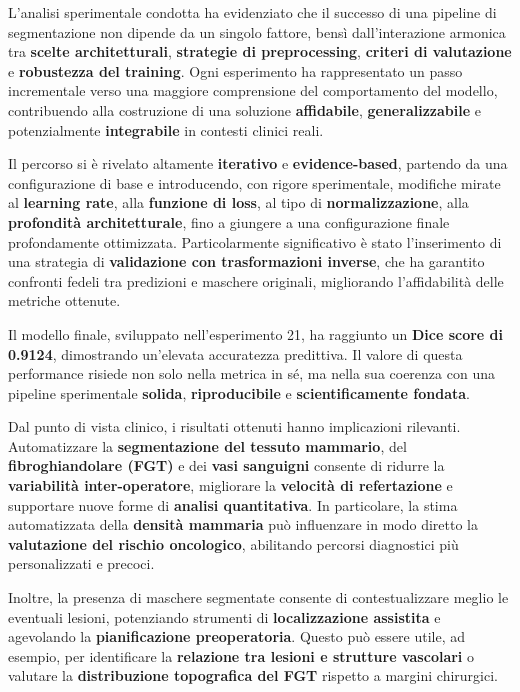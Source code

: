 


L’analisi sperimentale condotta ha evidenziato che il successo di una pipeline di segmentazione non dipende da un singolo fattore, bensì dall’interazione armonica tra \textbf{scelte architetturali}, \textbf{strategie di preprocessing}, \textbf{criteri di valutazione} e \textbf{robustezza del training}. Ogni esperimento ha rappresentato un passo incrementale verso una maggiore comprensione del comportamento del modello, contribuendo alla costruzione di una soluzione \textbf{affidabile}, \textbf{generalizzabile} e potenzialmente \textbf{integrabile} in contesti clinici reali.

Il percorso si è rivelato altamente \textbf{iterativo} e \textbf{evidence-based}, partendo da una configurazione di base e introducendo, con rigore sperimentale, modifiche mirate al \textbf{learning rate}, alla \textbf{funzione di loss}, al tipo di \textbf{normalizzazione}, alla \textbf{profondità architetturale}, fino a giungere a una configurazione finale profondamente ottimizzata. Particolarmente significativo è stato l’inserimento di una strategia di \textbf{validazione con trasformazioni inverse}, che ha garantito confronti fedeli tra predizioni e maschere originali, migliorando l’affidabilità delle metriche ottenute.


Il modello finale, sviluppato nell’esperimento 21, ha raggiunto un \textbf{Dice score di 0.9124}, dimostrando un'elevata accuratezza predittiva. Il valore di questa performance risiede non solo nella metrica in sé, ma nella sua coerenza con una pipeline sperimentale \textbf{solida}, \textbf{riproducibile} e \textbf{scientificamente fondata}.

Dal punto di vista clinico, i risultati ottenuti hanno implicazioni rilevanti. Automatizzare la \textbf{segmentazione del tessuto mammario}, del \textbf{fibroghiandolare (FGT)} e dei \textbf{vasi sanguigni} consente di ridurre la \textbf{variabilità inter-operatore}, migliorare la \textbf{velocità di refertazione} e supportare nuove forme di \textbf{analisi quantitativa}. In particolare, la stima automatizzata della \textbf{densità mammaria} può influenzare in modo diretto la \textbf{valutazione del rischio oncologico}, abilitando percorsi diagnostici più personalizzati e precoci.

Inoltre, la presenza di maschere segmentate consente di contestualizzare meglio le eventuali lesioni, potenziando strumenti di \textbf{localizzazione assistita} e agevolando la \textbf{pianificazione preoperatoria}. Questo può essere utile, ad esempio, per identificare la \textbf{relazione tra lesioni e strutture vascolari} o valutare la \textbf{distribuzione topografica del FGT} rispetto a margini chirurgici.

